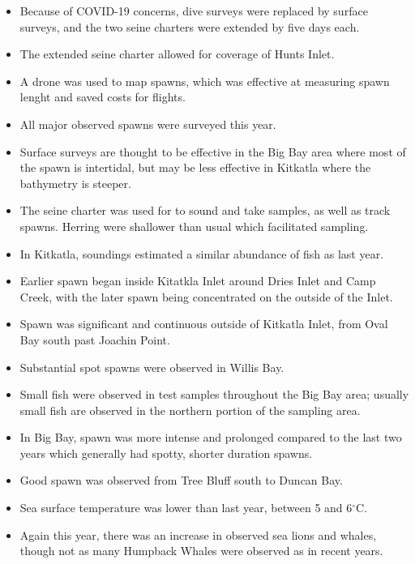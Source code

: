\begin{itemize}

\item Because of COVID-19 concerns, dive surveys were replaced by surface surveys, and the two seine charters were extended by five days each.

\item The extended seine charter allowed for coverage of Hunts Inlet.

\item A drone was used to map spawns, which was effective at measuring spawn lenght and saved costs for flights.

\item All major observed spawns were surveyed this year.

\item Surface surveys are thought to be effective in the Big Bay area where most of the spawn is intertidal,
but may be less effective in Kitkatla where the bathymetry is steeper.

\item The seine charter was used for to sound and take samples, as well as track spawns.
Herring were shallower than usual which facilitated sampling.

\item In Kitkatla, soundings estimated a similar abundance of fish as last year.

\item Earlier spawn began inside Kitatkla Inlet around Dries Inlet and Camp Creek, with the later spawn being concentrated on the outside of the Inlet.

\item Spawn was significant and continuous outside of Kitkatla Inlet, from Oval Bay south past Joachin Point.

\item Substantial spot spawns were observed in Willis Bay.

\item Small fish were observed in test samples throughout the Big Bay area;
usually small fish are observed in the northern portion of the sampling area.

\item In Big Bay, spawn was more intense and prolonged compared to the last two years which generally had spotty, shorter duration spawns.

\item Good spawn was observed from Tree Bluff south to Duncan Bay.

\item Sea surface temperature was lower than last year, between 5 and 6$^\circ\text{C}$.

\item Again this year, there was an increase in observed sea lions and whales,
though not as many Humpback Whales were observed as in recent years.

\end{itemize}
